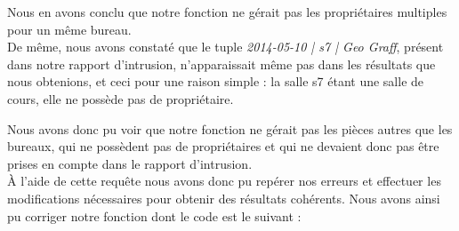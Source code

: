 Nous en avons conclu que notre fonction ne gérait pas les propriétaires multiples pour un même bureau.\\

De même, nous avons constaté que le tuple \textit{2014-05-10 | s7 | Geo Graff}, présent dans notre rapport d'intrusion, n'apparaissait même pas dans les résultats que nous obtenions, et ceci pour une raison simple : la salle s7 étant une salle de cours, elle ne possède pas de propriétaire.

Nous avons donc pu voir que notre fonction ne gérait pas les pièces autres que les bureaux, qui ne possèdent pas de propriétaires et qui ne devaient donc pas être prises en compte dans le rapport d'intrusion.\\

À l'aide de cette requête nous avons donc pu repérer nos erreurs et effectuer les modifications nécessaires pour obtenir des résultats cohérents. Nous avons ainsi pu corriger notre fonction  dont le code est le suivant :\\

\inputminted[tabsize=4,linenos,fontsize=\small]{sql}{code/3.sql}